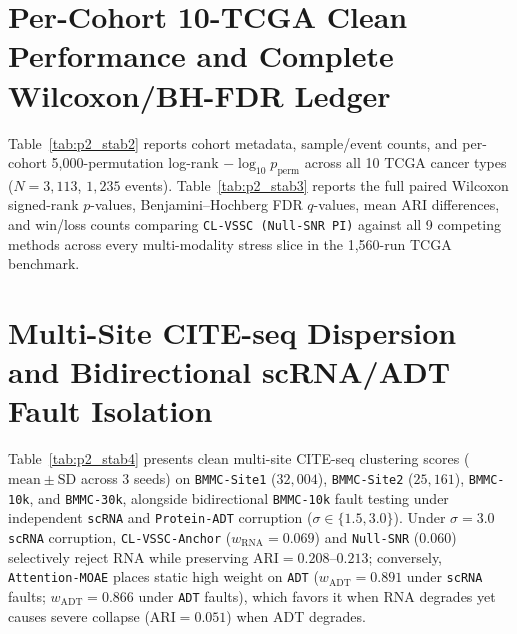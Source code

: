 \documentclass[journal]{IEEEtran}
\begin{document}
\FloatBarrier

\section{Per-Cohort 10-TCGA Clean Performance and Complete Wilcoxon/BH-FDR Ledger}\label{sec:s3}

Table~\ref{tab:p2_stab2} reports cohort metadata, sample/event counts, and per-cohort 5,000-permutation log-rank $-\log_{10}p_{\mathrm{perm}}$ across all 10 TCGA cancer types ($N = 3{,}113$, $1{,}235$ events). Table~\ref{tab:p2_stab3} reports the full paired Wilcoxon signed-rank $p$-values, Benjamini--Hochberg FDR $q$-values, mean ARI differences, and win/loss counts comparing \texttt{CL-VSSC (Null-SNR PI)} against all 9 competing methods across every multi-modality stress slice in the 1,560-run TCGA benchmark.




\FloatBarrier

\section{Multi-Site CITE-seq Dispersion and Bidirectional scRNA/ADT Fault Isolation}\label{sec:s4}

Table~\ref{tab:p2_stab4} presents clean multi-site CITE-seq clustering scores ($\mathrm{mean} \pm \mathrm{SD}$ across 3 seeds) on \texttt{BMMC-Site1} ($32{,}004$), \texttt{BMMC-Site2} ($25{,}161$), \texttt{BMMC-10k}, and \texttt{BMMC-30k}, alongside bidirectional \texttt{BMMC-10k} fault testing under independent \texttt{scRNA} and \texttt{Protein-ADT} corruption ($\sigma \in \{1.5, 3.0\}$). Under $\sigma = 3.0$ \texttt{scRNA} corruption, \texttt{CL-VSSC-Anchor} ($w_{\mathrm{RNA}} = 0.069$) and \texttt{Null-SNR} ($0.060$) selectively reject RNA while preserving $\mathrm{ARI} = 0.208\text{--}0.213$; conversely, \texttt{Attention-MOAE} places static high weight on \texttt{ADT} ($w_{\mathrm{ADT}} = 0.891$ under \texttt{scRNA} faults; $w_{\mathrm{ADT}} = 0.866$ under \texttt{ADT} faults), which favors it when RNA degrades yet causes severe collapse ($\mathrm{ARI} = 0.051$) when ADT degrades.



\FloatBarrier


\end{document}
